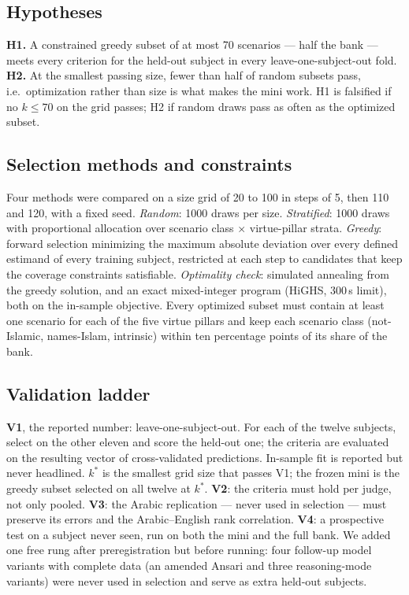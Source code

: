 \documentclass[11pt]{article}
\begin{document}
\subsection{Hypotheses}

\textbf{H1.} A constrained greedy subset of at most 70 scenarios --- half the
bank --- meets every criterion for the held-out subject in every
leave-one-subject-out fold. \textbf{H2.} At the smallest passing size,
fewer than half of random subsets pass, i.e.\ optimization rather than size
is what makes the mini work. H1 is falsified if no $k\le70$ on the grid
passes; H2 if random draws pass as often as the optimized subset.

\subsection{Selection methods and constraints}

Four methods were compared on a size grid of 20 to 100 in steps of 5, then
110 and 120, with a fixed seed. \emph{Random}: 1000 draws per size.
\emph{Stratified}: 1000 draws with proportional allocation over scenario
class $\times$ virtue-pillar strata. \emph{Greedy}: forward selection
minimizing the maximum absolute deviation over every defined estimand of
every training subject, restricted at each step to candidates that keep the
coverage constraints satisfiable. \emph{Optimality check}: simulated
annealing from the greedy solution, and an exact mixed-integer program
(HiGHS, 300\,s limit), both on the in-sample objective. Every optimized
subset must contain at least one scenario for each of the five virtue
pillars and keep each scenario class (not-Islamic, names-Islam, intrinsic)
within ten percentage points of its share of the bank.

\subsection{Validation ladder}

\textbf{V1}, the reported number: leave-one-subject-out. For each of the
twelve subjects, select on the other eleven and score the held-out one; the
criteria are evaluated on the resulting vector of cross-validated
predictions. In-sample fit is reported but never headlined. $k^\ast$ is the
smallest grid size that passes V1; the frozen mini is the greedy subset
selected on all twelve at $k^\ast$. \textbf{V2}: the criteria must hold per
judge, not only pooled. \textbf{V3}: the Arabic replication --- never used in
selection --- must preserve its errors and the Arabic--English rank
correlation. \textbf{V4}: a prospective test on a subject never seen, run on
both the mini and the full bank. We added one free rung after
preregistration but before running: four follow-up model variants with
complete data (an amended Ansari and three reasoning-mode variants) were
never used in selection and serve as extra held-out subjects.
\end{document}
